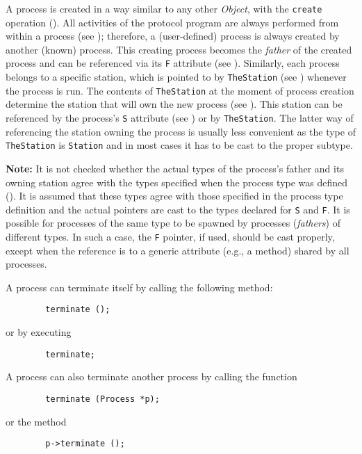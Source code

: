 A process is created in a way similar to any other {\em Object}, with the
{\tt create} operation ().
All activities of the protocol program are always performed from
within a process (see ); therefore, a (user-defined)
process is always created by another (known) process.
This creating process becomes the {\em father\/} of the created process
and can be referenced via its {\tt F} attribute (see ).
Similarly, each process belongs to a specific station, which is pointed to
by {\tt TheStation} (see ) whenever the process is run.
The contents of {\tt TheStation} at the moment of process creation
determine the station that will own the new process (see ).
This station can be referenced by the process's {\tt S} attribute
(see ) or by {\tt TheStation}.
The latter way of referencing the station owning the process is usually less
convenient as the type of {\tt TheStation} is {\tt Station} and in most
cases it has to be cast to the proper subtype.

\medskip

\noindent
{\bf Note:} It is not checked whether the actual types of the process's
father and its owning station agree with the types specified when the
process type was defined ().
It is assumed that these types agree with those specified in the
process type definition and the actual pointers are cast to the types
declared for {\tt S} and {\tt F}.
It is possible for processes of the same type to be spawned by processes
({\em fathers\/}) of different types.
In such a case, the {\tt F} pointer, if used, should be cast properly, except
when the reference is to a generic attribute (e.g., a method)
shared by all processes.

\medskip

A process can terminate itself by calling the following method:
\begin{verbatim}
        terminate ();
\end{verbatim}
or by executing
\begin{verbatim}
        terminate;
\end{verbatim}
A process can also terminate another process by calling the function
\begin{verbatim}
        terminate (Process *p);
\end{verbatim}
or the method
\begin{verbatim}
        p->terminate ();
\end{verbatim}

